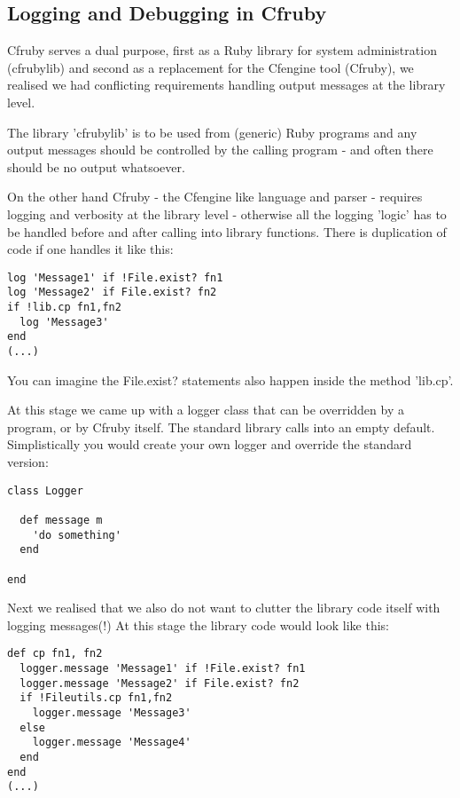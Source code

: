 
\subsection{Logging and Debugging in Cfruby}

Cfruby serves a dual purpose, first as a Ruby library for system
administration (cfrubylib) and second as a replacement for the
Cfengine tool (Cfruby), we realised we had conflicting requirements
handling output messages at the library level.

The library 'cfrubylib' is to be used from (generic) Ruby programs and
any output messages should be controlled by the calling program - and
often there should be no output whatsoever.

On the other hand Cfruby - the Cfengine like language and parser -
requires logging and verbosity at the library level - otherwise all
the logging 'logic' has to be handled before and after calling into
library functions. There is duplication of code if one handles it like
this:

\begin{verbatim}
log 'Message1' if !File.exist? fn1
log 'Message2' if File.exist? fn2
if !lib.cp fn1,fn2
  log 'Message3' 
end
(...)
\end{verbatim}

You can imagine the File.exist? statements also happen inside the
method 'lib.cp'. 

At this stage we came up with a logger class that can be overridden by
a program, or by Cfruby itself. The standard library calls into an
empty default. Simplistically you would create your own logger and
override the standard version:

\begin{verbatim}
class Logger

  def message m
    'do something'
  end

end
\end{verbatim}

Next we realised that we also do not want to clutter the library code
itself with logging messages(!) At this stage the library code would
look like this:

\begin{verbatim}
def cp fn1, fn2
  logger.message 'Message1' if !File.exist? fn1
  logger.message 'Message2' if File.exist? fn2
  if !Fileutils.cp fn1,fn2
    logger.message 'Message3' 
  else
    logger.message 'Message4'
  end
end
(...)
\end{verbatim}

